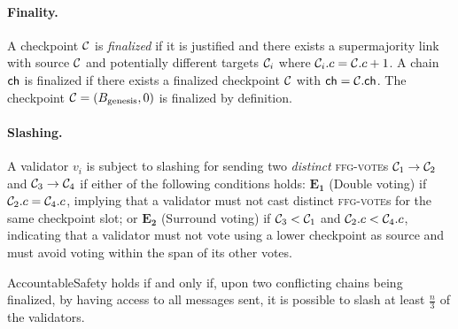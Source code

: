 \paragraph*{Finality.}
A checkpoint \(\mathcal{C}\) is \emph{finalized} if it is justified and there exists a supermajority link with source \(\mathcal{C}\) and potentially different targets \(\mathcal{C}_i\) where \(\mathcal{C}_i.c = \mathcal{C}.c + 1\). A chain \(\mathsf{ch}\) is finalized if there exists a finalized checkpoint \(\mathcal{C}\) with \(\mathsf{ch} = \mathcal{C}.\mathsf{ch}\). The checkpoint \(\mathcal{C} = (B_\text{genesis}, 0)\) is finalized by definition.


\paragraph*{Slashing.}
A validator \(v_i\) is subject to slashing for sending two \emph{distinct} \textsc{ffg-vote}s \(\mathcal{C}_1 \to \mathcal{C}_2\) and \(\mathcal{C}_3 \to \mathcal{C}_4\) if either of the following conditions holds: {\(\mathbf{E_1}\) (Double voting)} if \(\mathcal{C}_2.c = \mathcal{C}_4.c\), implying that a validator must not cast distinct \textsc{ffg-vote}s for the same checkpoint slot; or {\(\mathbf{E_2}\) (Surround voting)} if \(\mathcal{C}_3 < \mathcal{C}_1\)
 and \(\mathcal{C}_2.c < \mathcal{C}_4.c\), indicating that a validator must not vote using a lower checkpoint as source and must avoid voting within the span of its other votes.


 \begin{definition}[AccountableSafety]
  \label{def:acc-safety}
  AccountableSafety holds if and only if, upon two conflicting chains being finalized, 
 {by having access to all messages sent,} it is possible to slash at least $\frac{n}{3}$ of the validators.
\end{definition}